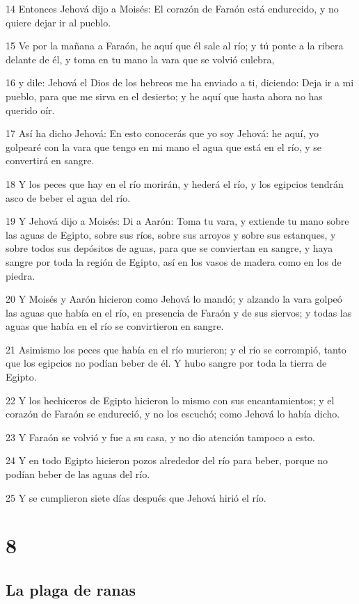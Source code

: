 \par 14 Entonces Jehová dijo a Moisés: El corazón de Faraón está endurecido, y no quiere dejar ir al pueblo.
\par 15 Ve por la mañana a Faraón, he aquí que él sale al río; y tú ponte a la ribera delante de él, y toma en tu mano la vara que se volvió culebra,
\par 16 y dile: Jehová el Dios de los hebreos me ha enviado a ti, diciendo: Deja ir a mi pueblo, para que me sirva en el desierto; y he aquí que hasta ahora no has querido oír.
\par 17 Así ha dicho Jehová: En esto conocerás que yo soy Jehová: he aquí, yo golpearé con la vara que tengo en mi mano el agua que está en el río, y se convertirá en sangre.
\par 18 Y los peces que hay en el río morirán, y hederá el río, y los egipcios tendrán asco de beber el agua del río.
\par 19 Y Jehová dijo a Moisés: Di a Aarón: Toma tu vara, y extiende tu mano sobre las aguas de Egipto, sobre sus ríos, sobre sus arroyos y sobre sus estanques, y sobre todos sus depósitos de aguas, para que se conviertan en sangre, y haya sangre por toda la región de Egipto, así en los vasos de madera como en los de piedra.
\par 20 Y Moisés y Aarón hicieron como Jehová lo mandó; y alzando la vara golpeó las aguas que había en el río, en presencia de Faraón y de sus siervos; y todas las aguas que había en el río se convirtieron en sangre.
\par 21 Asimismo los peces que había en el río murieron; y el río se corrompió, tanto que los egipcios no podían beber de él. Y hubo sangre por toda la tierra de Egipto.
\par 22 Y los hechiceros de Egipto hicieron lo mismo con sus encantamientos; y el corazón de Faraón se endureció, y no los escuchó; como Jehová lo había dicho.
\par 23 Y Faraón se volvió y fue a su casa, y no dio atención tampoco a esto.
\par 24 Y en todo Egipto hicieron pozos alrededor del río para beber, porque no podían beber de las aguas del río.
\par 25 Y se cumplieron siete días después que Jehová hirió el río.

\chapter{8}

\section*{La plaga de ranas}

